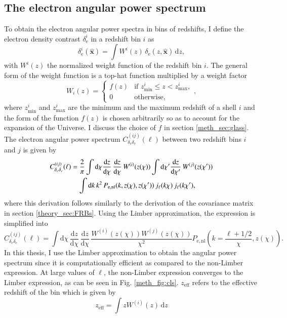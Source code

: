 \subsection{The electron angular power spectrum} \label{meth_sec:angular_power_spectrum}
To obtain the electron angular power spectra in bins of redshifts, I define the electron density contrast $\delta_\mathrm{e}^i$ in a redshift bin $i$ as
\begin{equation}\label{eq:project_delta_e}
    \delta_\mathrm{e}^i(\mathbf{\hat{x}}) = \int W^i(z) \, \delta_\mathrm{e}(z, \mathbf{\hat{x}}) \, \mathrm{d}z,
\end{equation}
with $W^i(z)$ the normalized weight function of the redshift bin $i$. The general form of the weight function is a top-hat function multiplied by a weight factor
\begin{equation}
    W_i(z) = \begin{cases} f(z) & \text{if } z^{i}_\mathrm{min} \leq z < z^i_\mathrm{max}, \\ 0 & \text{otherwise,} \end{cases},
\end{equation}
where $z^{i}_\mathrm{min}$ and $z^{i}_\mathrm{max}$ are the minimum and the maximum redshift of a shell $i$ and the form of the function $f(z)$ is chosen arbitrarily so as to account for the expansion of the Universe. I discuss the choice of $f$ in section \ref{meth_sec:glass}. The electron angular power spectrum $C_{\delta_e \delta_e}^{(ij)}(\ell)$ between two redshift bins $i$ and $j$ is given by
\begin{align}
    C_{\delta_e \delta_e}^{(ij)}(\ell) &= \frac{2}{\pi} \int \mathrm{d}\chi \frac{\mathrm{d}z}{\mathrm{d}\chi}\, \frac{\mathrm{d}z}{\mathrm{d}\chi} \, W^{(i)}(z(\chi)) \int \mathrm{d}\chi' \frac{\mathrm{d}z}{\mathrm{d}\chi'}\, W^{(j)}(z(\chi')) \notag \\
    &\quad \int \mathrm{d}k \, k^2 \, P_\mathrm{e, nl}(k, z(\chi), z(\chi')) \, j_\ell(k\chi) \, j_\ell(k\chi'),
\end{align}
where this derivation follows similarly to the derivation of the covariance matrix in section \ref{theory_sec:FRBs}. Using the Limber approximation, the expression is simplified into
\begin{equation}
    C_{\delta_e \delta_e}^{(ij)}(\ell) = \int \mathrm{d}\chi \, \frac{\mathrm{d}z}{\mathrm{d}\chi} \,\frac{\mathrm{d}z}{\mathrm{d}\chi} \, \frac{W^{(i)}(z(\chi)) W^{(j)}(z(\chi))}{\chi^2} P_\mathrm{e, nl}\left(k = \frac{\ell + 1/2}{\chi}, z(\chi)\right).
\end{equation}
In this thesis, I use the Limber approximation to obtain the angular power spectrum since it is computationally efficient as compared to the non-Limber expression. At large values of $\ell$, the non-Limber expression converges to the Limber expression, as can be seen in Fig. \ref{meth_fig:cls}. $z_\mathrm{eff}$ refers to the effective redshift of the bin which is given by
\begin{equation}\label{eq:z_eff}
    z_\mathrm{eff} = \int z W^{(i)}(z) \, \mathrm{d}z
\end{equation}




